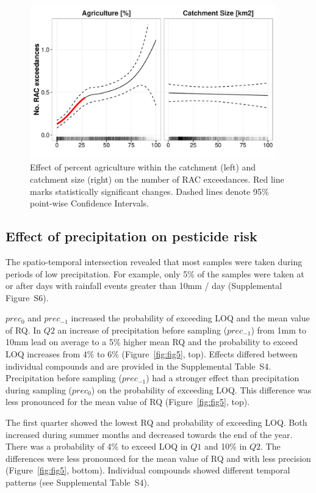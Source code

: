 \documentclass[journal=esthag,manuscript=article]{achemso}
\begin{document}
\begin{figure}[ht]
  \includegraphics[width=0.95\textwidth]{figure4.pdf}
  \caption{Effect of percent agriculture within the catchment (left) and catchment size (right) on the number of RAC exceedances. Red line marks statistically significant changes. Dashed lines denote 95\% point-wise Confidence Intervals.
  }
  \label{fig:fig4}
\end{figure}


\subsection{Effect of precipitation on pesticide risk}
The spatio-temporal intersection revealed that most samples were taken during periods of low precipitation.
For example, only 5\% of the samples were taken at or after days with rainfall events greater than 10mm / day (Supplemental Figure~S6). 

$prec_{0}$ and $prec_{-1}$ increased the probability of exceeding LOQ and the mean value of RQ.
In $Q2$ an increase of precipitation before sampling ($prec_{-1}$) from 1mm to 10mm lead on average to a 5\% higher mean RQ and the probability to exceed LOQ increases from 4\% to 6\% (Figure~\ref{fig:fig5}, top). %
Effects differed between individual compounds and are provided in the Supplemental Table~S4.
Precipitation before sampling ($prec_{-1}$) had a stronger effect than precipitation during sampling ($prec_{0}$) on the probability of exceeding LOQ. 
This difference was less pronounced for the mean value of RQ (Figure~\ref{fig:fig5}, top). 

The first quarter showed the lowest RQ and probability of exceeding LOQ.
Both increased during summer months and decreased towards the end of the year.
There was a probability of 4\% to exceed LOQ in $Q1$ and 10\% in $Q2$.
The differences were less pronounced for the mean value of RQ and with less precision (Figure~\ref{fig:fig5}, bottom). 
Individual compounds showed different temporal patterns (see Supplemental Table~S4).
\end{document}
